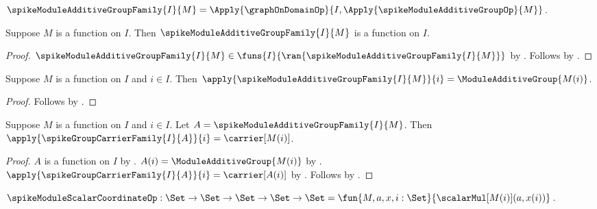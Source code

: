 \begin{definition}\label{spike_module_additive_group_family}
    $\spikeModuleAdditiveGroupFamily{I}{M}
        =\Apply{\graphOnDomainOp}{
            I,\Apply{\spikeModuleAdditiveGroupOp}{M}}$.
\end{definition}

\begin{proposition}\label{spike_module_additive_group_family_type}
    Suppose $M$ is a function on $I$.
    Then $\spikeModuleAdditiveGroupFamily{I}{M}$ is a function on $I$.
\end{proposition}
\begin{proof}
    $\spikeModuleAdditiveGroupFamily{I}{M}\in
        \funs{I}{\ran{\spikeModuleAdditiveGroupFamily{I}{M}}}$ by
        .
    Follows by .
\end{proof}

\begin{proposition}\label{spike_module_additive_group_family_apply}
    Suppose $M$ is a function on $I$ and $i\in I$.
    Then
        $\apply{\spikeModuleAdditiveGroupFamily{I}{M}}{i}
            =\ModuleAdditiveGroup{M(i)}$.
\end{proposition}
\begin{proof}
    Follows by
        .
\end{proof}

\begin{proposition}\label{spike_module_product_carrier_coordinate}
    Suppose $M$ is a function on $I$ and $i\in I$.
    Let $A=\spikeModuleAdditiveGroupFamily{I}{M}$.
    Then
        $\apply{\spikeGroupCarrierFamily{I}{A}}{i}=\carrier[M(i)]$.
\end{proposition}
\begin{proof}
    $A$ is a function on $I$ by
        .
    $A(i)=\ModuleAdditiveGroup{M(i)}$ by
        .
    $\apply{\spikeGroupCarrierFamily{I}{A}}{i}=\carrier[A(i)]$ by
        .
    Follows by .
\end{proof}

\begin{definition}\label{spike_module_scalar_coordinate_op}
    $\spikeModuleScalarCoordinateOp:
        \Set\to\Set\to\Set\to\Set\to\Set
        =\fun{M,a,x,i:\Set}{\scalarMul[M(i)](a,x(i))}$.
\end{definition}

